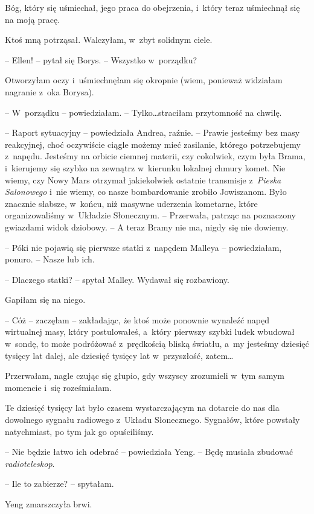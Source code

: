 \documentclass[oneside,polish,11pt,sfheadings]{mwbk}
\begin{document}
Bóg, który się uśmiechał, jego praca do obejrzenia, i~który teraz
uśmiechnął się na moją pracę.

Ktoś mną potrząsał. Walczyłam, w~zbyt solidnym ciele.

-- Ellen! -- pytał się Borys. -- Wszystko w~porządku?

Otworzyłam oczy i~uśmiechnęłam się okropnie (wiem, ponieważ widziałam
nagranie z~oka Borysa).

-- W~porządku -- powiedziałam. -- Tylko\ldots  straciłam przytomność na chwilę.

-- Raport sytuacyjny -- powiedziała Andrea, raźnie. -- Prawie jesteśmy bez
masy reakcyjnej, choć oczywiście ciągle możemy mieć zasilanie, którego
potrzebujemy z~napędu. Jesteśmy na orbicie ciemnej materii, czy
cokolwiek, czym była Brama, i~kierujemy się szybko na zewnątrz w~kierunku lokalnej chmury komet. Nie wiemy, czy Nowy Mars otrzymał
jakiekolwiek ostatnie transmisje z~\textit{Pieska Salonowego} i~nie wiemy,
co nasze bombardowanie zrobiło Jowiszanom. Było znacznie słabsze, w~końcu, niż masywne uderzenia kometarne, które organizowaliśmy w~Układzie
Słonecznym. -- Przerwała, patrząc na poznaczony gwiazdami widok dziobowy.
-- A teraz Bramy nie ma, nigdy się nie dowiemy.

-- Póki nie pojawią się pierwsze statki z~napędem Malleya -- powiedziałam,
ponuro. -- Nasze lub ich.

-- Dlaczego statki? -- spytał Malley. Wydawał się rozbawiony.

Gapiłam się na niego. 

-- Cóż -- zaczęłam -- zakładając, że ktoś może
ponownie wynaleźć napęd wirtualnej masy, który postulowałeś, a~który
pierwszy szybki ludek wbudował w~sondę, to może podróżować z~prędkością
bliską światłu, a~my jesteśmy dziesięć tysięcy lat dalej, ale dziesięć
tysięcy lat w~przyszłość, zatem\ldots 

Przerwałam, nagle czując się głupio, gdy wszyscy zrozumieli w~tym samym
momencie i~się roześmiałam.

Te dziesięć tysięcy lat było czasem wystarczającym na dotarcie do nas
dla dowolnego sygnału radiowego z~Układu Słonecznego. Sygnałów, które
powstały natychmiast, po tym jak go opuściliśmy.

-- Nie będzie łatwo ich odebrać -- powiedziała Yeng. -- Będę musiała
zbudować \textit{radioteleskop}.

-- Ile to zabierze? -- spytałam.

Yeng zmarszczyła brwi. 
\end{document}
